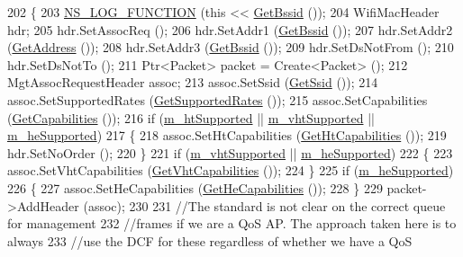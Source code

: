 \begin{DoxyCode}
202 \{
203   \hyperlink{log-macros-disabled_8h_a90b90d5bad1f39cb1b64923ea94c0761}{NS\_LOG\_FUNCTION} (\textcolor{keyword}{this} << \hyperlink{classns3_1_1RegularWifiMac_acd1705832e3f4a235c2ca6a84b5a577b}{GetBssid} ());
204   WifiMacHeader hdr;
205   hdr.SetAssocReq ();
206   hdr.SetAddr1 (\hyperlink{classns3_1_1RegularWifiMac_acd1705832e3f4a235c2ca6a84b5a577b}{GetBssid} ());
207   hdr.SetAddr2 (\hyperlink{classns3_1_1RegularWifiMac_aea719a7d05fbc664c50479fc900777b7}{GetAddress} ());
208   hdr.SetAddr3 (\hyperlink{classns3_1_1RegularWifiMac_acd1705832e3f4a235c2ca6a84b5a577b}{GetBssid} ());
209   hdr.SetDsNotFrom ();
210   hdr.SetDsNotTo ();
211   Ptr<Packet> packet = Create<Packet> ();
212   MgtAssocRequestHeader assoc;
213   assoc.SetSsid (\hyperlink{classns3_1_1RegularWifiMac_a3cd4316ccd72111fa94f7091d4deb521}{GetSsid} ());
214   assoc.SetSupportedRates (\hyperlink{classns3_1_1StaWifiMac_abe67dfa143223ed5237c4083bb474883}{GetSupportedRates} ());
215   assoc.SetCapabilities (\hyperlink{classns3_1_1StaWifiMac_a221366443a56ade6ce0b112a37bd4f6d}{GetCapabilities} ());
216   \textcolor{keywordflow}{if} (\hyperlink{classns3_1_1RegularWifiMac_a8950c44b8cf2ad1f9274821cf88adc7b}{m\_htSupported} || \hyperlink{classns3_1_1RegularWifiMac_a151f330fdeb3f83f9ec7cf07537f0e86}{m\_vhtSupported} || 
      \hyperlink{classns3_1_1RegularWifiMac_a9458143c722fa0b6e5d223d41585842a}{m\_heSupported})
217     \{
218       assoc.SetHtCapabilities (\hyperlink{classns3_1_1RegularWifiMac_ae2b0a52735a938a0f1ca233397ae2185}{GetHtCapabilities} ());
219       hdr.SetNoOrder ();
220     \}
221   \textcolor{keywordflow}{if} (\hyperlink{classns3_1_1RegularWifiMac_a151f330fdeb3f83f9ec7cf07537f0e86}{m\_vhtSupported} || \hyperlink{classns3_1_1RegularWifiMac_a9458143c722fa0b6e5d223d41585842a}{m\_heSupported})
222     \{
223       assoc.SetVhtCapabilities (\hyperlink{classns3_1_1RegularWifiMac_ade487870f5663694d30a2dd6a7e614e8}{GetVhtCapabilities} ());
224     \}
225   \textcolor{keywordflow}{if} (\hyperlink{classns3_1_1RegularWifiMac_a9458143c722fa0b6e5d223d41585842a}{m\_heSupported})
226     \{
227       assoc.SetHeCapabilities (\hyperlink{classns3_1_1RegularWifiMac_aea22761a20fdff9f6c1a9acc49d63700}{GetHeCapabilities} ());
228     \}
229   packet->AddHeader (assoc);
230 
231   \textcolor{comment}{//The standard is not clear on the correct queue for management}
232   \textcolor{comment}{//frames if we are a QoS AP. The approach taken here is to always}
233   \textcolor{comment}{//use the DCF for these regardless of whether we have a QoS}

\end{DoxyCode}
